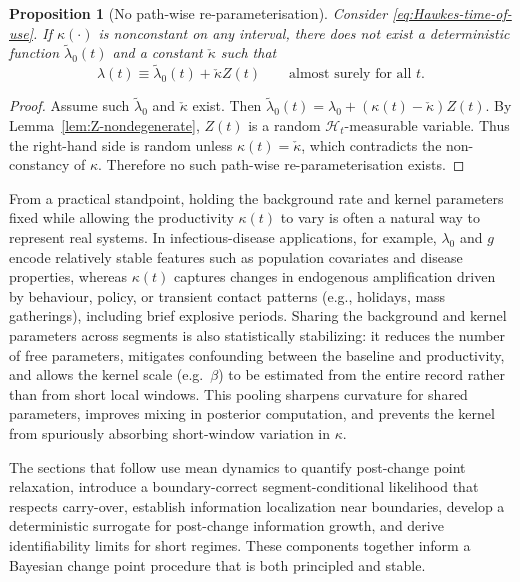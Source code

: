 \documentclass{article}
\theoremstyle{plain}
\newtheorem{proposition}[theorem]{Proposition}
\theoremstyle{definition}
\newcommand{\1}{\mathbf{1}}
\begin{document}
    \begin{proposition}[No path-wise re-parameterisation]
    \label{prop:no-reparam}
    Consider \eqref{eq:Hawkes-time-of-use}. If $\kappa(\cdot)$ is nonconstant on any interval, there does not exist a deterministic function $\tilde\lambda_0(t)$ and a constant $\check\kappa$ such that
    \[
    \lambda(t)\equiv \tilde\lambda_0(t)+\check\kappa Z(t)\qquad\text{almost surely for all }t.
    \]
    \end{proposition}
    \begin{proof}
    Assume such $\tilde\lambda_0$ and $\check\kappa$ exist. Then
    \(
    \tilde\lambda_0(t)=\lambda_0+(\kappa(t)-\check\kappa)Z(t).
    \)
    By Lemma~\ref{lem:Z-nondegenerate}, $Z(t)$ is a random $\mathcal H_t$-measurable variable. Thus the right-hand side is random unless $\kappa(t)=\check\kappa$, which contradicts the non-constancy of $\kappa$. Therefore no such path-wise re-parameterisation exists.
    \end{proof}
    
    From a practical standpoint, holding the background rate and kernel parameters fixed while allowing the productivity $\kappa(t)$ to vary is often a natural way to represent real systems. In infectious-disease applications, for example, $\lambda_0$ and $g$ encode relatively stable features such as population covariates and disease properties, whereas $\kappa(t)$ captures changes in endogenous amplification driven by behaviour, policy, or transient contact patterns (e.g., holidays, mass gatherings), including brief explosive periods. Sharing the background and kernel parameters across segments is also statistically stabilizing: it reduces the number of free parameters, mitigates confounding between the baseline and productivity, and allows the kernel scale (e.g.\ $\beta$) to be estimated from the entire record rather than from short local windows. This pooling sharpens curvature for shared parameters, improves mixing in posterior computation, and prevents the kernel from spuriously absorbing short-window variation in $\kappa$.
    
    The sections that follow use mean dynamics to quantify post-change point relaxation, introduce a boundary-correct segment-conditional likelihood that respects carry-over, establish information localization near boundaries, develop a deterministic surrogate for post-change information growth, and derive identifiability limits for short regimes. These components together inform a Bayesian change point procedure that is both principled and stable.
    
\end{document}
